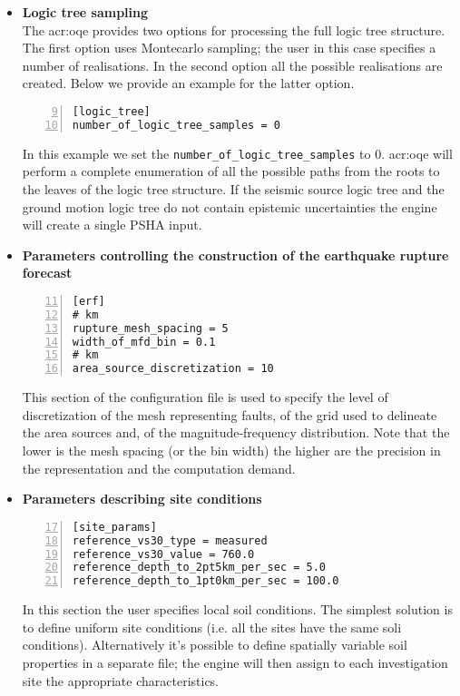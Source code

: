\begin{itemize}
\begin{Verbatim}[frame=single, commandchars=\\\{\}, fontsize=\small,
    firstnumber=5, numbers=left, numbersep=2pt]
\end{Verbatim}
%
\item \textbf{Logic tree sampling} \hfill \\
    The \gls{acr:oqe} provides two options for processing the full 
    logic tree structure. The first option uses Montecarlo sampling;
    the user in this case specifies a number of realisations. In the 
    second option all the possible realisations are created. Below 
    we provide an example for the latter option.
\begin{Verbatim}[frame=single, commandchars=\\\{\}, fontsize=\small,
    firstnumber=9, numbers=left, numbersep=2pt]
[logic_tree]
number_of_logic_tree_samples = 0
\end{Verbatim}
    In this example we set the \texttt{number\_of\_logic\_tree\_samples}
    to 0. \gls{acr:oqe} will perform a complete enumeration of all 
    the possible paths from the roots to the leaves of the logic tree 
    structure. If the seismic source logic tree and the ground motion
    logic tree do not contain epistemic uncertainties the engine will
    create a single PSHA input.
%
\item \textbf{Parameters controlling the construction of the earthquake 
    rupture forecast}
\begin{Verbatim}[frame=single, commandchars=\\\{\}, fontsize=\small,
    firstnumber=11, numbers=left, numbersep=2pt]
[erf]
# km
rupture_mesh_spacing = 5
width_of_mfd_bin = 0.1
# km
area_source_discretization = 10
\end{Verbatim}
This section of the configuration file is used to specify the 
level of discretization of the mesh representing faults, of the grid
used to delineate the area sources and, of the magnitude-frequency 
distribution. 
Note that the lower is the mesh spacing (or the bin width) the higher 
are the precision in the representation and the computation demand.
%
\item \textbf{Parameters describing site conditions}
\begin{Verbatim}[frame=single, commandchars=\\\{\}, fontsize=\small,
    firstnumber=17, numbers=left, numbersep=2pt]
[site_params]
reference_vs30_type = measured
reference_vs30_value = 760.0
reference_depth_to_2pt5km_per_sec = 5.0
reference_depth_to_1pt0km_per_sec = 100.0
\end{Verbatim}
In this section the user specifies local soil conditions. The simplest
solution is to define uniform site conditions (i.e. all the sites have 
the same soli conditions). Alternatively it's possible to define 
spatially variable soil properties in a separate file; the engine will
then assign to each investigation site the appropriate characteristics.


\end{itemize}
